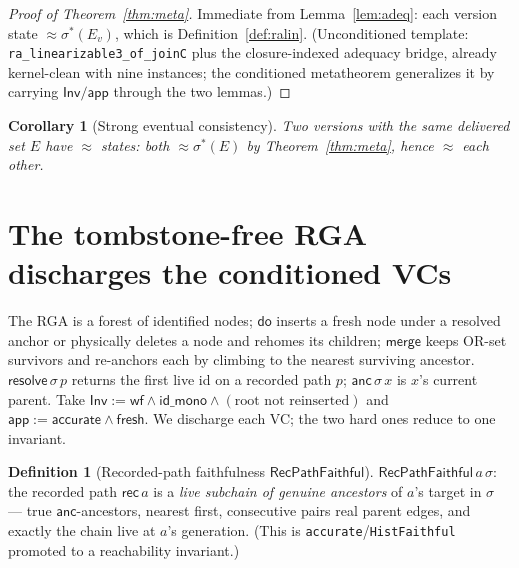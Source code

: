 \documentclass[11pt]{article}
\newtheorem{corollary}{Corollary}
\theoremstyle{definition}
\newtheorem{definition}{Definition}
\theoremstyle{remark}
\newcommand{\st}{\sigma}
\newcommand{\dodo}{\mathsf{do}}
\newcommand{\merge}{\mathsf{merge}}
\newcommand{\resolve}{\mathsf{resolve}}
\newcommand{\anc}{\mathsf{anc}}
\newcommand{\recList}{\mathsf{rec}}
\newcommand{\eqobs}{\approx}
\newcommand{\Inv}{\mathsf{Inv}}
\newcommand{\app}{\mathsf{app}}
\newcommand{\sigmacan}{\st^{\ast}}
\newcommand{\RVF}{\textsf{RecPathFaithful}}
\newcommand{\lean}[1]{\texttt{#1}}
\begin{document}
\begin{proof}[Proof of Theorem~\ref{thm:meta}]
Immediate from Lemma~\ref{lem:adeq}: each version state $\eqobs \sigmacan(E_v)$, which is
Definition~\ref{def:ralin}. (Unconditioned template: \lean{ra\_linearizable3\_of\_joinC} plus
the closure-indexed adequacy bridge, already kernel-clean with nine instances; the
conditioned metatheorem generalizes it by carrying $\Inv/\app$ through the two lemmas.)
\end{proof}

\begin{corollary}[Strong eventual consistency]\label{cor:sec}
Two versions with the same delivered set $E$ have $\eqobs$ states: both $\eqobs \sigmacan(E)$
by Theorem~\ref{thm:meta}, hence $\eqobs$ each other.
\end{corollary}

\section{The tombstone-free RGA discharges the conditioned VCs}\label{sec:rga}

The RGA is a forest of identified nodes; $\dodo$ inserts a fresh node under a resolved anchor
or physically deletes a node and rehomes its children; $\merge$ keeps OR-set survivors and
re-anchors each by climbing to the nearest surviving ancestor. $\resolve\,\st\,p$ returns the
first live id on a recorded path $p$; $\anc\,\st\,x$ is $x$'s current parent. Take
$\Inv := \mathsf{wf} \wedge \mathsf{id\_mono} \wedge (\text{root not reinserted})$ and
$\app := \mathsf{accurate} \wedge \mathsf{fresh}$. We discharge each VC; the two hard ones
reduce to one invariant.

\begin{definition}[Recorded-path faithfulness $\RVF$]\label{def:rvf}
$\RVF\,a\,\st$: the recorded path $\recList\,a$ is a \emph{live subchain of genuine
ancestors} of $a$'s target in $\st$ --- true $\anc$-ancestors, nearest first, consecutive
pairs real parent edges, and exactly the chain live at $a$'s generation. (This is
\lean{accurate}/\lean{HistFaithful} promoted to a reachability invariant.)
\end{definition}
\end{document}

